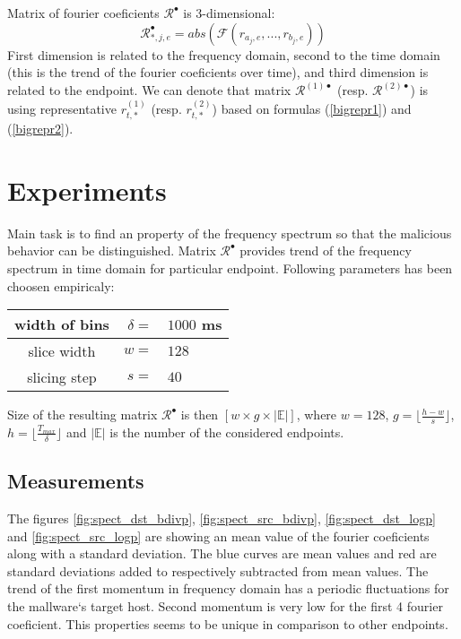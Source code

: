\documentclass[a4paper,journal]{IEEEtran}
\begin{document}
Matrix of fourier coeficients $\mathcal{R}^\bullet$ is 3-dimensional:
\begin{equation}\label{bigmatrix}
\mathcal{R}^\bullet_{*,j,e} = abs(\mathcal{F}(r_{a_j,e}, ..., r_{b_j,e}))
\end{equation}
First dimension is related to the frequency domain, second to the time domain 
(this is the trend of the fourier coeficients over time), 
and third dimension is related to the endpoint.
We can denote that matrix $\mathcal{R}^{(1)\bullet}$ (resp. $\mathcal{R}^{(2)\bullet}$)
is using representative $r_{t,*}^{(1)}$ (resp. $r_{t,*}^{(2)}$) based on formulas
(\ref{bigrepr1}) and (\ref{bigrepr2}).

\section{Experiments}
Main task is to find an property of the frequency spectrum so that the malicious behavior
can be distinguished. Matrix $\mathcal{R}^\bullet$ provides trend of the frequency spectrum
in time domain for particular endpoint.
Following parameters has been choosen empiricaly:

\begin{center}
\begin{tabular}{c|rl}
width of bins & $\delta =$ & $1000$ ms \\ \hline
slice width & $w =$ & $128$ \\ \hline
slicing step & $s=$ & $40$ \\
\end{tabular}
\end{center}

Size of the resulting matrix $\mathcal{R}^\bullet$ is then
$[w\times g\times \lvert\mathbb{E}\rvert]$, where $w=128$, $g=\lfloor\frac{h-w}{s} \rfloor$, 
$h = \lfloor\frac{T_{max}}{\delta}\rfloor$ and $\lvert\mathbb{E}\rvert $ is the number of the 
considered endpoints.

\subsection{Measurements}
The figures \ref{fig:spect_dst_bdivp},
\ref{fig:spect_src_bdivp}, \ref{fig:spect_dst_logp} and \ref{fig:spect_src_logp} are 
showing an mean value of the fourier coeficients along with a standard deviation.
The blue curves are mean values and red are standard deviations added to respectively 
subtracted from mean values. 
The trend of the first momentum in frequency domain has a periodic fluctuations
for the mallware`s target host. Second momentum is
very low for the first 4 fourier coeficient. This properties seems to be unique in 
comparison to other endpoints.
\end{document}
